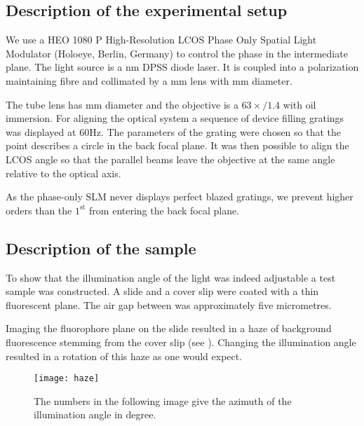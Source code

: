 \subsection{Description of the experimental setup}
We use a HEO 1080 P High-Resolution LCOS Phase Only Spatial Light
Modulator (Holoeye, Berlin, Germany) to control the phase in the
intermediate plane. The light source is a \unit[473]{nm} DPSS diode
laser. It is coupled into a polarization maintaining fibre and
collimated by a \unit[150]{mm} lens with \unit[50]{mm} diameter.

The tube lens has \unit[300]{mm} diameter and the objective is a
$63\times/1.4$ with oil immersion.  For aligning the optical system a
sequence of device filling gratings was displayed at 60Hz. The
parameters of the grating were chosen so that the point describes a
circle in the back focal plane. It was then possible to align the LCOS
angle so that the parallel beams leave the objective at the same angle
relative to the optical axis.

As the phase-only SLM never displays perfect blazed gratings, we
prevent higher orders than the $1^\textrm{st}$ from entering the back
focal plane.

\subsection{Description of the sample}
To show that the illumination angle of the light was indeed adjustable
a test sample was constructed. A slide and a cover slip were coated
with a thin fluorescent plane. The air gap between was approximately
five micrometres.

Imaging the fluorophore plane on the slide resulted in a haze of
background fluorescence stemming from the cover slip (see
). Changing the illumination angle resulted in a
rotation of this haze as one would expect.
\begin{figure}
  \centering
  \texttt{[image: haze]}
  \caption{The numbers in the following image give the azimuth of the
    illumination angle in degree.}
  \label{fig:holo-meas}
\end{figure}

